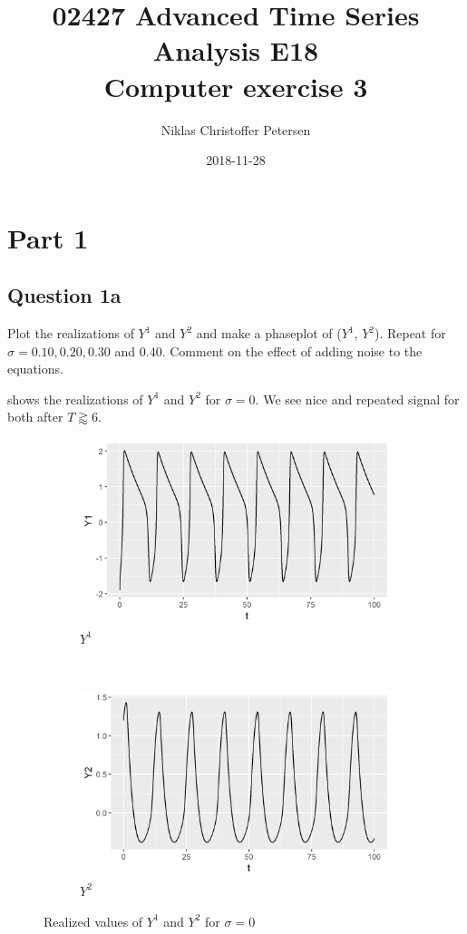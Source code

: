 \documentclass[a4paper]{article}
\title{{\small 02427 Advanced Time Series Analysis E18}\\Computer exercise 3}
\author{Niklas Christoffer Petersen}
\date{2018-11-28}
\begin{document}
\maketitle

\section{Part 1}

\subsection{Question 1a}
Plot the realizations of $Y^1$ and $Y^2$ and make a phaseplot of ($Y^1$, $Y^2$).
Repeat for $\sigma = 0.10, 0.20, 0.30$ and $0.40$. Comment on the effect of adding
noise to the equations.

 shows the realizations of $Y^1$ and $Y^2$ for $\sigma = 0$. We see nice and repeated signal for both after $T \gtrapprox 6$.

\begin{figure}[ht!]
    \centering
    \begin{subfigure}[b]{0.45\textwidth}
        \includegraphics[width=\textwidth]{part1a-sigma0-Y1.png}
        \caption{$Y^1$}
    \end{subfigure}
    ~
    \begin{subfigure}[b]{0.45\textwidth}
        \includegraphics[width=\textwidth]{part1a-sigma0-Y2.png}
        \caption{$Y^2$}
    \end{subfigure}
    \caption{Realized values of $Y^1$ and $Y^2$ for $\sigma = 0$}
    \label{fig:part1a-sigma0}
\end{figure}
\end{document}
